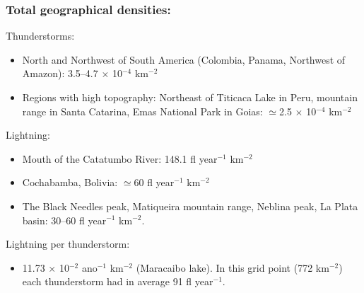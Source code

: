 \documentclass[smaller]{beamer}
\begin{document}
\begin{frame}
\frametitle{Total geographical densities:}
Thunderstorms:
\begin{itemize}
\item North and Northwest of South America (Colombia, Panama, Northwest of Amazon): 3.5--4.7 $\times$ 10$^{-4}$ km$^{-2}$
\item Regions with high topography: Northeast of Titicaca Lake in Peru, mountain range in Santa Catarina, Emas National Park in Goias: $\simeq$2.5 $\times$ 10$^{-4}$ km$^{-2}$
\end{itemize}
Lightning:
\begin{itemize}
\item Mouth of the Catatumbo River: 148.1 fl year$^{-1}$ km$^{-2}$ 
\item Cochabamba, Bolivia: $\simeq$60 fl year$^{-1}$ km$^{-2}$
\item The Black Needles peak, Matiqueira mountain range, Neblina peak, La Plata basin: 30--60 fl year$^{-1}$ km$^{-2}$.  
\end{itemize}
Lightning per thunderstorm:
\begin{itemize}
\item 11.73 $\times$ 10$^{-2}$ ano$^{-1}$ km$^{-2}$ (Maracaibo lake). In this grid point (772 km$^{-2}$) each thunderstorm had in average 91 fl year$^{-1}$.  
\end{itemize}

\end{frame}

\end{document}
